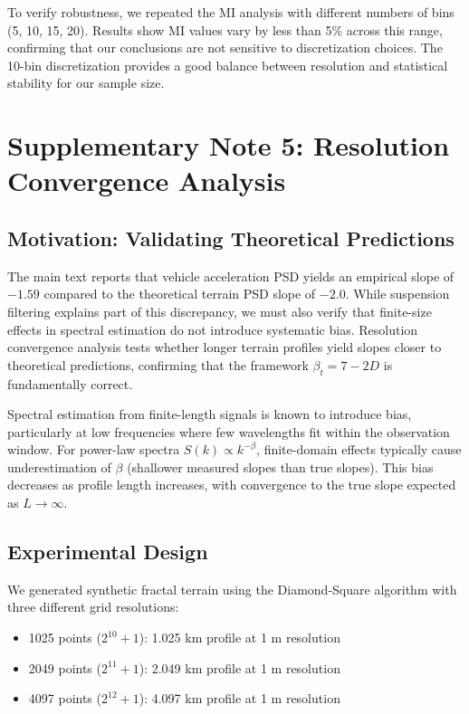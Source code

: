 \documentclass[11pt]{article}
\begin{document}
To verify robustness, we repeated the MI analysis with different numbers of bins (5, 10, 15, 20). Results show MI values vary by less than 5\% across this range, confirming that our conclusions are not sensitive to discretization choices. The 10-bin discretization provides a good balance between resolution and statistical stability for our sample size.


\section{Supplementary Note 5: Resolution Convergence Analysis}

\subsection{Motivation: Validating Theoretical Predictions}

The main text reports that vehicle acceleration PSD yields an empirical slope of $-1.59$ compared to the theoretical terrain PSD slope of $-2.0$. While suspension filtering explains part of this discrepancy, we must also verify that finite-size effects in spectral estimation do not introduce systematic bias. Resolution convergence analysis tests whether longer terrain profiles yield slopes closer to theoretical predictions, confirming that the framework $\beta_t = 7-2D$ is fundamentally correct.

Spectral estimation from finite-length signals is known to introduce bias, particularly at low frequencies where few wavelengths fit within the observation window\cite{Bendat2010}. For power-law spectra $S(k) \propto k^{-\beta}$, finite-domain effects typically cause underestimation of $\beta$ (shallower measured slopes than true slopes). This bias decreases as profile length increases, with convergence to the true slope expected as $L \to \infty$.

\subsection{Experimental Design}

We generated synthetic fractal terrain using the Diamond-Square algorithm with three different grid resolutions:
\begin{itemize}
\item 1025 points ($2^{10} + 1$): 1.025 km profile at 1 m resolution
\item 2049 points ($2^{11} + 1$): 2.049 km profile at 1 m resolution  
\item 4097 points ($2^{12} + 1$): 4.097 km profile at 1 m resolution
\end{itemize}
\end{document}
